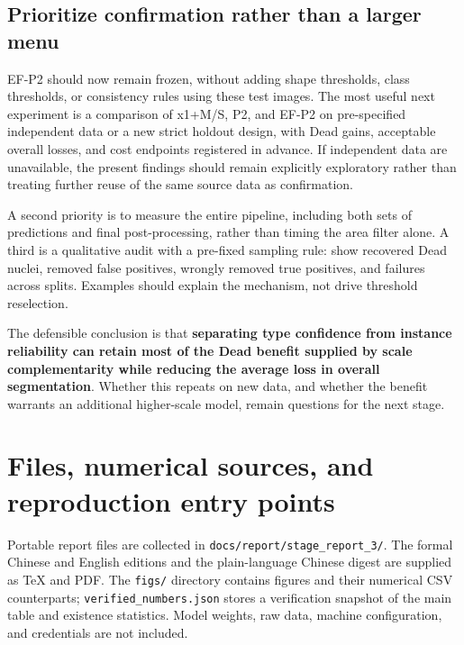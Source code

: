 \documentclass[11pt,a4paper]{article}
\newcommand{\code}[1]{\nolinkurl{#1}}
\begin{document}
\subsection{Prioritize confirmation rather than a larger menu}

EF-P2 should now remain frozen, without adding shape thresholds, class thresholds, or consistency rules using these test images. The most useful next experiment is a comparison of x1+M/S, P2, and EF-P2 on pre-specified independent data or a new strict holdout design, with Dead gains, acceptable overall losses, and cost endpoints registered in advance. If independent data are unavailable, the present findings should remain explicitly exploratory rather than treating further reuse of the same source data as confirmation.

A second priority is to measure the entire pipeline, including both sets of predictions and final post-processing, rather than timing the area filter alone. A third is a qualitative audit with a pre-fixed sampling rule: show recovered Dead nuclei, removed false positives, wrongly removed true positives, and failures across splits. Examples should explain the mechanism, not drive threshold reselection.

The defensible conclusion is that \textbf{separating type confidence from instance reliability can retain most of the Dead benefit supplied by scale complementarity while reducing the average loss in overall segmentation}. Whether this repeats on new data, and whether the benefit warrants an additional higher-scale model, remain questions for the next stage.

\appendix
\section{Files, numerical sources, and reproduction entry points}

Portable report files are collected in \code{docs/report/stage_report_3/}. The formal Chinese and English editions and the plain-language Chinese digest are supplied as TeX and PDF. The \code{figs/} directory contains figures and their numerical CSV counterparts; \code{verified_numbers.json} stores a verification snapshot of the main table and existence statistics. Model weights, raw data, machine configuration, and credentials are not included.
\end{document}
